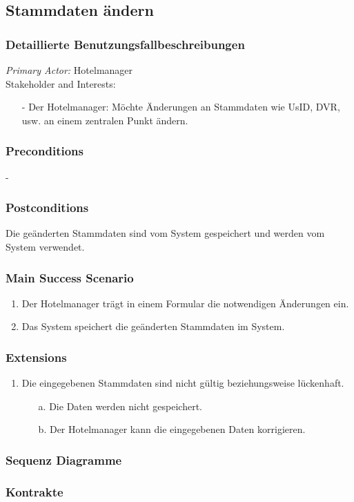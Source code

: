 \documentclass[./detailed_overview_usecases.tex]{subfiles}
\begin{document}
    \subsection{Stammdaten ändern}
    \subsubsection{Detaillierte Benutzungsfallbeschreibungen}
    \textit{Primary Actor:}
    Hotelmanager
    \\
    Stakeholder and Interests:
    \begin{itemize}
        \item[-] Der Hotelmanager: Möchte Änderungen an Stammdaten wie UsID, DVR, usw. an  einem zentralen Punkt ändern.
    \end{itemize}

    \subsubsection*{Preconditions}
    -
    \subsubsection*{Postconditions}
    Die geänderten Stammdaten sind vom System gespeichert und werden vom System verwendet.

    \subsubsection*{Main Success Scenario}
    \begin{enumerate}
        \item Der Hotelmanager trägt in einem Formular die notwendigen Änderungen ein.
        \item Das System speichert die geänderten Stammdaten im System.
    \end{enumerate}

    \subsubsection*{Extensions}
    \begin{enumerate}
        \item Die eingegebenen Stammdaten sind nicht gültig beziehungsweise lückenhaft.
        \begin{itemize}
            \item[a.] Die Daten werden nicht gespeichert.
            \item[b.] Der Hotelmanager kann die eingegebenen Daten korrigieren.
        \end{itemize}
    \end{enumerate}

    \subsubsection{Sequenz Diagramme}
    \subsubsection{Kontrakte}
\end{document}
